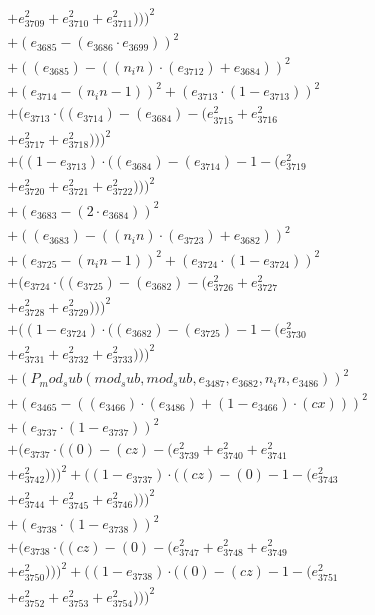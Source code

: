 \documentclass[10pt, a4paper]{article}
\begin{document}
\begin{small}
\begin{align*}
& + e_{3709}^{2} + e_{3710}^{2} + e_{3711}^{2})))^{2} \\
& + (e_{3685} - (e_{3686}  \cdot  e_{3699}))^{2} \\
& + ((e_{3685}) - ((n_in)  \cdot  (e_{3712}) + e_{3684}))^{2} \\
& + (e_{3714} - (n_in - 1))^{2} + (e_{3713}  \cdot  (1 - e_{3713}))^{2} \\
& + (e_{3713}  \cdot  ((e_{3714}) - (e_{3684}) - (e_{3715}^{2} + e_{3716}^{2} \\
& + e_{3717}^{2} + e_{3718}^{2})))^{2} \\
& + ((1 - e_{3713})  \cdot  ((e_{3684}) - (e_{3714}) - 1 - (e_{3719}^{2} \\
& + e_{3720}^{2} + e_{3721}^{2} + e_{3722}^{2})))^{2} \\
& + (e_{3683} - (2  \cdot  e_{3684}))^{2} \\
& + ((e_{3683}) - ((n_in)  \cdot  (e_{3723}) + e_{3682}))^{2} \\
& + (e_{3725} - (n_in - 1))^{2} + (e_{3724}  \cdot  (1 - e_{3724}))^{2} \\
& + (e_{3724}  \cdot  ((e_{3725}) - (e_{3682}) - (e_{3726}^{2} + e_{3727}^{2} \\
& + e_{3728}^{2} + e_{3729}^{2})))^{2} \\
& + ((1 - e_{3724})  \cdot  ((e_{3682}) - (e_{3725}) - 1 - (e_{3730}^{2} \\
& + e_{3731}^{2} + e_{3732}^{2} + e_{3733}^{2})))^{2} \\
& + (P_mod_sub(mod_sub, mod_sub, e_{3487}, e_{3682}, n_in, e_{3486}))^{2} \\
& + (e_{3465} - ((e_{3466})  \cdot  (e_{3486}) + (1 - e_{3466})  \cdot  (cx)))^{2} \\
& + (e_{3737}  \cdot  (1 - e_{3737}))^{2} \\
& + (e_{3737}  \cdot  ((0) - (cz) - (e_{3739}^{2} + e_{3740}^{2} + e_{3741}^{2} \\
& + e_{3742}^{2})))^{2} + ((1 - e_{3737})  \cdot  ((cz) - (0) - 1 - (e_{3743}^{2} \\
& + e_{3744}^{2} + e_{3745}^{2} + e_{3746}^{2})))^{2} \\
& + (e_{3738}  \cdot  (1 - e_{3738}))^{2} \\
& + (e_{3738}  \cdot  ((cz) - (0) - (e_{3747}^{2} + e_{3748}^{2} + e_{3749}^{2} \\
& + e_{3750}^{2})))^{2} + ((1 - e_{3738})  \cdot  ((0) - (cz) - 1 - (e_{3751}^{2} \\
& + e_{3752}^{2} + e_{3753}^{2} + e_{3754}^{2})))^{2} \\

\end{align*}
\end{small}
\end{document}
